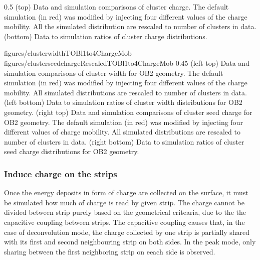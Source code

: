                  {0.5}       %
                 { (top) Data and simulation comparisons of cluster charge. The default simulation (in red) was modified by injecting four different values of the charge mobility. All the simulated distribution are rescaled to number of clusters in data. (bottom) Data to simulation ratios of cluster charge distributions. }

                 {figures/clusterwidthTOBl1to4ChargeMob}
                 {figures/clusterseedchargeRescaledTOBl1to4ChargeMob} %
                 {0.45}       %
                 {(left top) Data and simulation  comparisons of cluster width for OB2 geometry. The default simulation (in red) was modified by injecting four different values of the charge mobility. All simulated distributions are rescaled to number of clusters in data. (left bottom) Data to simulation ratios of cluster width distributions for OB2 geometry. (right top) Data and simulation  comparisons of cluster seed charge for OB2 geometry. The default simulation (in red) was modified by injecting four different values of charge mobility. All simulated distributions are rescaled to number of clusters in data. (right bottom) Data to simulation ratios of cluster seed charge distributions for OB2 geometry. }


\subsubsection{Induce charge on the strips}

Once the energy deposits in form of charge are collected on the surface, it must be simulated how much of charge is read by given strip. The charge cannot be divided between strip purely based on the geometrical critearia, due to the the capacitive coupling between strips. The capacitive coupling causes that, in the case of deconvolution mode, the charge collected by one strip is partially shared with its first and second neighbouring strip on both sides. In the peak mode, only sharing between the first neighboring strip on eeach side is observed.   

